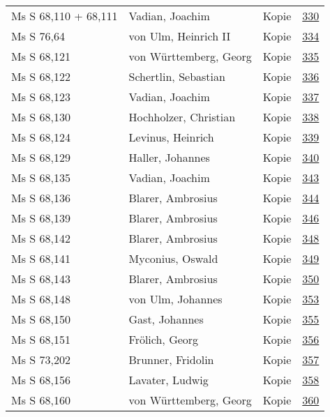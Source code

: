 \documentclass[10pt,a4paper,landscape]{report}
\begin{document}
\begin{longtable}{p{16cm}p{4cm}lr}
Ms S 68,110 + 68,111	&	Vadian, Joachim	&	Kopie	&	\href{http://130.60.24.72/assignment/330}{330}\\
Ms S 76,64	&	von Ulm, Heinrich II	&	Kopie	&	\href{http://130.60.24.72/assignment/334}{334}\\
Ms S 68,121	&	von Württemberg, Georg	&	Kopie	&	\href{http://130.60.24.72/assignment/335}{335}\\
Ms S 68,122	&	Schertlin, Sebastian	&	Kopie	&	\href{http://130.60.24.72/assignment/336}{336}\\
Ms S 68,123	&	Vadian, Joachim	&	Kopie	&	\href{http://130.60.24.72/assignment/337}{337}\\
Ms S 68,130	&	Hochholzer, Christian	&	Kopie	&	\href{http://130.60.24.72/assignment/338}{338}\\
Ms S 68,124	&	Levinus, Heinrich	&	Kopie	&	\href{http://130.60.24.72/assignment/339}{339}\\
Ms S 68,129	&	Haller, Johannes	&	Kopie	&	\href{http://130.60.24.72/assignment/340}{340}\\
Ms S 68,135	&	Vadian, Joachim	&	Kopie	&	\href{http://130.60.24.72/assignment/343}{343}\\
Ms S 68,136	&	Blarer, Ambrosius	&	Kopie	&	\href{http://130.60.24.72/assignment/344}{344}\\
Ms S 68,139	&	Blarer, Ambrosius	&	Kopie	&	\href{http://130.60.24.72/assignment/346}{346}\\
Ms S 68,142	&	Blarer, Ambrosius	&	Kopie	&	\href{http://130.60.24.72/assignment/348}{348}\\
Ms S 68,141	&	Myconius, Oswald	&	Kopie	&	\href{http://130.60.24.72/assignment/349}{349}\\
Ms S 68,143	&	Blarer, Ambrosius	&	Kopie	&	\href{http://130.60.24.72/assignment/350}{350}\\
Ms S 68,148	&	von Ulm, Johannes	&	Kopie	&	\href{http://130.60.24.72/assignment/353}{353}\\
Ms S 68,150	&	Gast, Johannes	&	Kopie	&	\href{http://130.60.24.72/assignment/355}{355}\\
Ms S 68,151	&	Frölich, Georg	&	Kopie	&	\href{http://130.60.24.72/assignment/356}{356}\\
Ms S 73,202	&	Brunner, Fridolin	&	Kopie	&	\href{http://130.60.24.72/assignment/357}{357}\\
Ms S 68,156	&	Lavater, Ludwig	&	Kopie	&	\href{http://130.60.24.72/assignment/358}{358}\\
Ms S 68,160	&	von Württemberg, Georg	&	Kopie	&	\href{http://130.60.24.72/assignment/360}{360}\\

\end{longtable}
\end{document}

